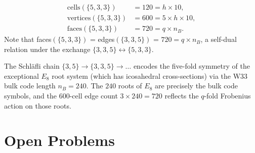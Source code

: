 \begin{proposition}
\begin{align}
\text{cells}(\{5,3,3\}) &= 120 = h \times 10, \\
\text{vertices}(\{5,3,3\}) &= 600 = 5 \times h \times 10, \\
\text{faces}(\{5,3,3\}) &= 720 = q \times n_B.
\end{align}
Note that faces$(\{5,3,3\})$ = edges$(\{3,3,5\})$ = $720 = q \times n_B$,
a self-dual relation under the exchange $\{3,3,5\} \leftrightarrow \{5,3,3\}$.
\end{proposition}

\begin{remark}
The Schl\"afli chain $\{3,5\} \to \{3,3,5\} \to \ldots$ encodes the
five-fold symmetry of the exceptional $E_8$ root system
(which has icosahedral cross-sections) via the W33 bulk code length $n_B = 240$.
The $240$ roots of $E_8$ are precisely the bulk code symbols,
and the $600$-cell edge count $3 \times 240 = 720$ reflects the
$q$-fold Frobenius action on those roots.
\end{remark}

\section{Open Problems}\label{sec:open}

